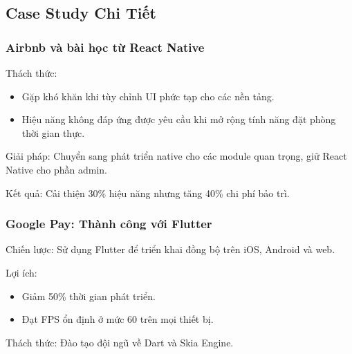 \subsection{Case Study Chi Tiết}
\renewcommand{\labelitemi}{--}    
    \begin{flushleft}
      \subsubsection{Airbnb và bài học từ React Native}
        \begin{flushleft}
          \hspace*{0.8cm}Thách thức:
          \setlength{\leftmargini}{1.5cm}
          \begin{itemize}
            \item Gặp khó khăn khi tùy chỉnh UI phức tạp cho các nền tảng.
            \item Hiệu năng không đáp ứng được yêu cầu khi mở rộng tính năng đặt phòng thời gian thực.
          \end{itemize}
        \end{flushleft}

        \begin{flushleft}
          \hspace*{0.8cm}Giải pháp: Chuyển sang phát triển native cho các module quan trọng, giữ React Native cho phần admin.
        \end{flushleft}

        \begin{flushleft}
          \hspace*{0.8cm}Kết quả: Cải thiện 30\% hiệu năng nhưng tăng 40\% chi phí bảo trì.
        \end{flushleft}

      \subsubsection{Google Pay: Thành công với Flutter}
        \begin{flushleft}
          \hspace*{0.8cm}Chiến lược: Sử dụng Flutter để triển khai đồng bộ trên iOS, Android và web.
        \end{flushleft}

        \begin{flushleft}
          \hspace*{0.8cm}Lợi ích:
          \setlength{\leftmargini}{1.5cm}
          \begin{itemize}
            \item Giảm 50\% thời gian phát triển.
            \item Đạt FPS ổn định ở mức 60 trên mọi thiết bị.
          \end{itemize}
        \end{flushleft}

        \begin{flushleft}
          \hspace*{0.8cm}Thách thức: Đào tạo đội ngũ về Dart và Skia Engine.
        \end{flushleft}
    \end{flushleft}

